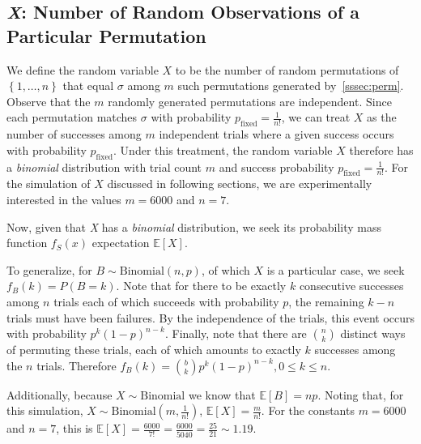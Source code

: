 \documentclass[11pt, oneside]{article}   	%
\begin{document}
\subsection{\textit{X}: Number of Random Observations of a Particular Permutation}\label{ssec:x}
We define the random variable $X$ to be the number of random permutations of $\left\{1, \dots, n\right\}$ that equal $\sigma$ among $m$ such permutations generated by~\ref{sssec:perm}. Observe that the $m$ randomly generated permutations are independent. Since each permutation matches $\sigma$ with probability $p_{\text{fixed}} = \frac{1}{n!}$, we can treat $X$ as the number of successes among $m$ independent trials where a given success occurs with probability $p_{\text{fixed}}$. Under this treatment, the random variable $X$ therefore has a \textit{binomial} distribution with trial count $m$ and success probability $p_{\text{fixed}} = \frac{1}{n!}$. For the simulation of $X$ discussed in following sections, we are experimentally interested in the values $m = 6000$ and $n = 7$.

Now, given that \textit{X} has a \textit{binomial} distribution, we seek its probability mass function $f_S(x)$ expectation $\mathbb{E}[X]$.

To generalize, for $B \sim \text{Binomial}(n, p)$, of which $X$ is a particular case, we seek $f_B(k) = P(B = k)$. Note that for there to be exactly $k$ consecutive successes among $n$ trials each of which succeeds with probability $p$, the remaining $k - n$ trials must have been failures. By the independence of the trials, this event occurs with probability $p^k(1-p)^{n-k}$. Finally, note that there are ${n \choose k}$ distinct ways of permuting these trials, each of which amounts to exactly $k$ successes among the $n$ trials. Therefore $f_B(k) = {b \choose k}p^k(1-p)^{n-k}, 0 \leq k \leq n$.

Additionally, because $X \sim \text{Binomial}$ we know that $\mathbb{E}[B] = np$. Noting that, for this simulation, $X \sim \text{Binomial}(m,\frac{1}{n!})$, $\mathbb{E}[X] = \frac{m}{n!}$. For the constants $m = 6000$ and $n = 7$, this is $\mathbb{E}[X] = \frac{6000}{7!} = \frac{6000}{5040} = \frac{25}{21} \sim 1.19$.
\end{document}
